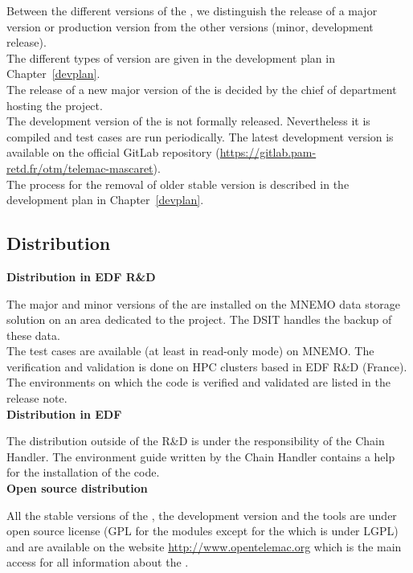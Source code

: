 Between the different versions of the \telemacsystem, we distinguish the
release of a major version or production version from the other versions
(minor, development release).\\

The different types of version are given in the development plan in
Chapter~\ref{devplan}.\\

The release of a new major version of the \telemacsystem{} is decided by the
chief of department hosting the project.\\

The development version of the \telemacsystem{} is not formally released.
Nevertheless it is compiled and test cases are run periodically. The latest
development version is available on the official GitLab repository
(\url{https://gitlab.pam-retd.fr/otm/telemac-mascaret}).\\

The process for the removal of older stable version is described in the
development plan in Chapter~\ref{devplan}.

\subsection{Distribution}

\textbf{Distribution in EDF R\&D}

The major and minor versions of the \telemacsystem{} are installed on the MNEMO
data storage solution on an area dedicated to the project. The DSIT handles
the backup of these data.\\

The test cases are available (at least in read-only mode) on MNEMO. The
verification and validation is done on HPC clusters based in EDF R\&D (France).
The environments on which the code is verified and validated are listed in the
release note.\\

\textbf{Distribution in EDF}

The distribution outside of the R\&D is under the responsibility of the
\telemacsystem{} Chain Handler. The environment guide written by the Chain
Handler contains a help for the installation of the code.\\

\textbf{Open source distribution}

All the stable versions of the \telemacsystem, the development version and the
tools are under open source license (GPL for the \telemacsystem{} modules
except for the \bief{} which is under LGPL) and are available on the website
\url{http://www.opentelemac.org} which is the main access for all information
about the \telemacsystem.\\

